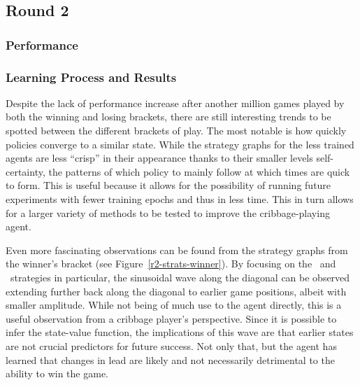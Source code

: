 
\subsection{Round 2}

\subsubsection{Performance}








\subsubsection{Learning Process and Results}




Despite the lack of performance increase after another million games played by
both the winning and losing brackets,
there are still interesting trends to be spotted between the different brackets
of play.
%
The most notable is how quickly policies converge to a similar state.
%
While the strategy graphs for the less trained agents are less ``crisp''
in their appearance thanks to their smaller levels self-certainty,
the patterns of which policy to mainly follow at which times
are quick to form.
%
This is useful because it allows for the possibility of running future
experiments with fewer training epochs and thus in less time.
%
This in turn allows for a larger variety of methods to be tested to improve
the cribbage-playing agent.

Even more fascinating observations can be found from the strategy graphs
from the winner's bracket (see Figure~\ref{r2-strats-winner}).
%
By focusing on the \handmaxmin\ and \handmaxavg\ strategies in particular,
the sinusoidal wave along the diagonal can be observed extending further
back along the diagonal to earlier game positions,
albeit with smaller amplitude.
%
While not being of much use to the agent directly,
this is a useful observation from a cribbage player's perspective.
%
Since it is possible to infer the state-value function,
the implications of this wave are that earlier states are not crucial
predictors for future success.
%
Not only that,
but the agent has learned that changes in lead are likely and not necessarily
detrimental to the ability to win the game.


